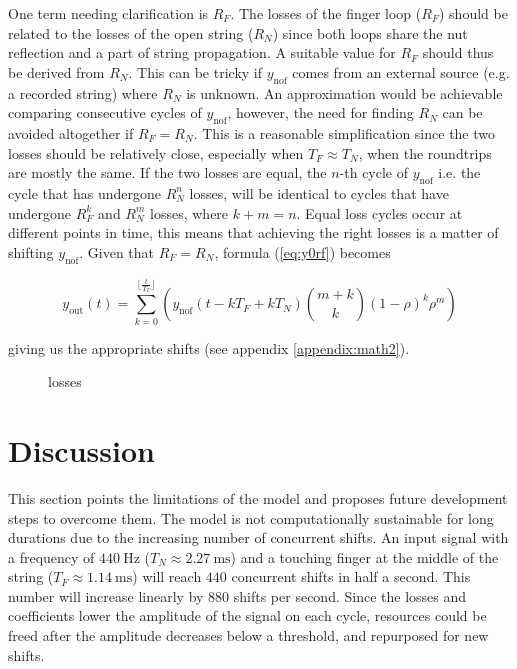 \documentclass{sigchi}
\begin{document}
One term needing clarification is $R_F$.
The losses of the finger loop ($R_F$) should be related to the losses of the open string ($R_N$) since both loops share the nut reflection and a part of string propagation.
A suitable value for $R_F$ should thus be derived from $R_N$.
This can be tricky if $y_{\textrm{nof}}$ comes from an external source (e.g. a recorded string) where $R_N$ is unknown.
An approximation would be achievable comparing consecutive cycles of $y_{\textrm{nof}}$, however, the need for finding $R_N$ can be avoided altogether if $R_F = R_N$.
This is a reasonable simplification since the two losses should be relatively close, especially when $T_F \approx T_N$, when the roundtrips are mostly the same.
If the two losses are equal, the $n$-th cycle of $y_{\textrm{nof}}$ i.e. the cycle that has undergone $R_N^n$ losses, will be identical to cycles that have undergone $R_F^k$ and $R_N^m$ losses, where $k+m=n$.
Equal loss cycles occur at different points in time, this means that achieving the right losses is a matter of shifting $y_{\textrm{nof}}$.
Given that $R_F = R_N$, formula (\ref{eq:y0rf}) becomes

\begin{equation} \label{eq:y0}
	y_{\textrm{out}}(t) = \sum_{k=0}^{\lfloor \frac{t}{T_F} \rfloor}\left(y_{\textrm{nof}}(t - kT_F + kT_N)\binom{m+k}{k} (1 - \rho)^{k} \rho^m\right)
\end{equation}

giving us the appropriate shifts (see appendix \ref{appendix:math2}).

\begin{figure}[h]
	\centering
	\caption{
		losses
	}
	\label{fig:losses}
\end{figure}

\section{Discussion}
This section points the limitations of the model and proposes future development steps to overcome them.
The model is not computationally sustainable for long durations due to the increasing number of concurrent shifts.
An input signal with a frequency of $\SI{440}{\hertz}$ ($T_N\approx\SI{2.27}{\milli\second}$) and a touching finger at the middle of the string ($T_F\approx\SI{1.14}{\milli\second}$) will reach $440$ concurrent shifts in half a second.
This number will increase linearly by $880$ shifts per second.
Since the losses and coefficients lower the amplitude of the signal on each cycle, resources could be freed after the amplitude decreases below a threshold, and repurposed for new shifts.
\end{document}
